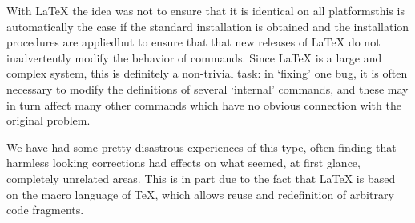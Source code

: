 \documentclass{ltugboat}
\begin{document}
With \LaTeX{} the idea was not to ensure that it is identical on all
platforms\Dash this is automatically the case if the standard
installation is obtained and the installation procedures are
applied\Dash but to ensure that that new releases of \LaTeX{} do not
inadvertently modify the behavior of commands.  Since \LaTeX{} is a
large and complex system, this is definitely a non-trivial
task: in `fixing' one bug, it is often necessary to modify the
definitions of several `internal' commands, and these may in turn
affect many other commands which have no obvious connection with the
original problem.

We have had some pretty disastrous experiences of this type, often
finding that harmless looking corrections had effects on what seemed,
at first glance, completely unrelated areas. This is in part due to
the fact that \LaTeX{} is based on the macro language of \TeX{}, which
allows reuse and redefinition of arbitrary code fragments.
\end{document}
